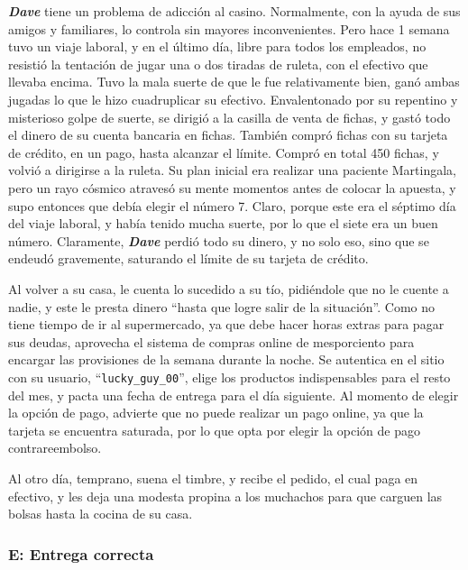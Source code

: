 \textbf{\emph{Dave}} tiene un problema de adicción al casino. Normalmente, con
la ayuda de sus amigos y familiares, lo controla sin mayores inconvenientes.
Pero hace 1 semana tuvo un viaje laboral, y en el último día, libre para todos
los empleados, no resistió la tentación de jugar una o dos tiradas de ruleta,
con el efectivo que llevaba encima. Tuvo la mala suerte de que le fue
relativamente bien, ganó ambas jugadas lo que le hizo cuadruplicar su
efectivo. Envalentonado por su repentino y misterioso golpe de suerte, se
dirigió a la casilla de venta de fichas, y gastó todo el dinero de su cuenta
bancaria en fichas. También compró fichas con su tarjeta de crédito, en un
pago, hasta alcanzar el límite. Compró en total 450 fichas, y volvió a
dirigirse a la ruleta. Su plan inicial era realizar una paciente Martingala,
pero un rayo cósmico atravesó su mente momentos antes de colocar la apuesta, y
supo entonces que debía elegir el número 7. Claro, porque este era el séptimo
día del viaje laboral, y había tenido mucha suerte, por lo que el siete era un
buen número. Claramente, \textbf{\emph{Dave}} perdió todo su dinero, y no solo
eso, sino que se endeudó gravemente, saturando el límite de su tarjeta de
crédito.

Al volver a su casa, le cuenta lo sucedido a su tío, pidiéndole que no le
cuente a nadie, y este le presta dinero ``hasta que logre salir de la
situación''. Como no tiene tiempo de ir al supermercado, ya que debe hacer
horas extras para pagar sus deudas, aprovecha el sistema de compras online de
mesporciento para encargar las provisiones de la semana durante la noche. Se
autentica en el sitio con su usuario, ``\texttt{lucky\_guy\_00}'', elige los
productos indispensables para el resto del mes, y pacta una fecha de entrega
para el día siguiente. Al momento de elegir la opción de pago, advierte que no
puede realizar un pago online, ya que la tarjeta se encuentra saturada, por lo
que opta por elegir la opción de pago contrareembolso.

Al otro día, temprano, suena el timbre, y recibe el pedido, el cual paga en
efectivo, y les deja una modesta propina a los muchachos para que carguen las
bolsas hasta la cocina de su casa.

\subsubsection{E: Entrega correcta}

